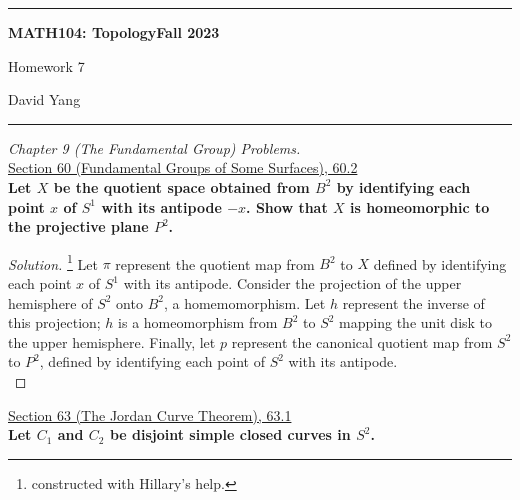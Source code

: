 \documentclass[11pt]{article}
\newenvironment{solution}
  {\renewcommand\qedsymbol{$\blacksquare$}\begin{proof}[Solution]}
  {\end{proof}}
\begin{document}
	\hrule
	\begin{center}
        \textbf{MATH104: Topology}\hfill \textbf{Fall 2023}\newline

		{\Large Homework 7}

		David Yang
	\end{center}

\hrule

\vspace{1em}

\textit{Chapter 9 (The Fundamental Group) Problems.} \\

\underline{Section 60 (Fundamental Groups of Some Surfaces), 60.2} \\

\textbf{Let $X$ be the quotient space obtained from $B^2$ by identifying each point $x$ of $S^1$ with its antipode $-x$. 
Show that $X$ is homeomorphic to the projective plane $P^2$.} 

\begin{solution}\footnote{constructed with Hillary's help.}
Let $\pi$ represent the quotient map from $B^2$ to $X$ defined by identifying each point $x$ of $S^1$ with its antipode. 
Consider the projection of the upper hemisphere of $S^2$ onto $B^2$, a homemomorphism. Let $h$ represent the inverse of this projection; $h$ is a homeomorphism from $B^2$ to $S^2$ mapping the unit disk to the upper hemisphere. 
Finally, let $p$ represent the canonical quotient map from $S^2$ to $P^2$, defined by identifying each point of $S^2$ with its antipode. \\



\end{solution}

\newpage

\underline{Section 63 (The Jordan Curve Theorem), 63.1} \\

\textbf{Let $C_1$ and $C_2$ be disjoint simple closed curves in $S^2$.}
\end{document}
